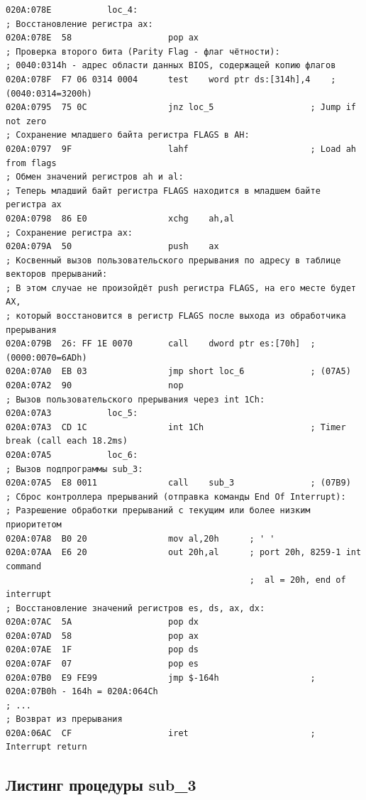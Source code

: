 \documentclass[a4paper,12pt]{article}
\begin{document}
\begin{lstlisting}[style={asm}]
020A:078E			loc_4:
; Восстановление регистра ax:
020A:078E  58				    pop	ax
; Проверка второго бита (Parity Flag - флаг чётности):
; 0040:0314h - адрес области данных BIOS, содержащей копию флагов
020A:078F  F7 06 0314 0004	    test	word ptr ds:[314h],4	; (0040:0314=3200h)
020A:0795  75 0C			    jnz	loc_5			        ; Jump if not zero
; Сохранение младшего байта регистра FLAGS в AH:
020A:0797  9F				    lahf				        ; Load ah from flags
; Обмен значений регистров ah и al: 
; Теперь младший байт регистра FLAGS находится в младшем байте регистра ax
020A:0798  86 E0			    xchg	ah,al
; Сохранение регистра ax:
020A:079A  50				    push	ax
; Косвенный вызов пользовательского прерывания по адресу в таблице векторов прерываний:
; В этом случае не произойдёт push регистра FLAGS, на его месте будет AX, 
; который восстановится в регистр FLAGS после выхода из обработчика прерывания
020A:079B  26: FF 1E 0070	    call	dword ptr es:[70h]	; (0000:0070=6ADh)
020A:07A0  EB 03			    jmp	short loc_6		        ; (07A5)
020A:07A2  90				    nop
; Вызов пользовательского прерывания через int 1Ch:
020A:07A3			loc_5:
020A:07A3  CD 1C			    int	1Ch			            ; Timer break (call each 18.2ms)
020A:07A5			loc_6:
; Вызов подпрограммы sub_3:
020A:07A5  E8 0011			    call	sub_3			    ; (07B9)
; Сброс контроллера прерываний (отправка команды End Of Interrupt):
; Разрешение обработки прерываний с текущим или более низким приоритетом
020A:07A8  B0 20			    mov	al,20h		; ' '
020A:07AA  E6 20			    out	20h,al		; port 20h, 8259-1 int command
                                                ;  al = 20h, end of interrupt
; Восстановление значений регистров es, ds, ax, dx:
020A:07AC  5A				    pop	dx
020A:07AD  58				    pop	ax
020A:07AE  1F				    pop	ds
020A:07AF  07				    pop	es
020A:07B0  E9 FE99			    jmp	$-164h 				    ; 020A:07B0h - 164h = 020A:064Ch
; ...
; Возврат из прерывания
020A:06AC  CF					iret						; Interrupt return
\end{lstlisting}

\subsection{Листинг процедуры sub\_3}
\end{document}
